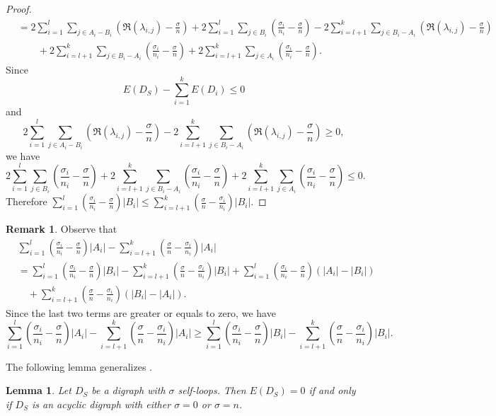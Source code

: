 \documentclass[12pt,a4paper,reqno]{amsart}
\numberwithin{equation}{section}
\theoremstyle{plain}
\newtheorem{lemma}[theorem]{Lemma}
\theoremstyle{definition}
\newtheorem{remark}[theorem]{Remark}
\newcommand{\<}{\langle}
\renewcommand{\>}{\rangle}
\begin{document}
\begin{proof}
\begin{align*}
			&= 2\sum_{i=1}^l \sum_{j\in A_i-B_i} \left( \Re(\lambda_{i,j})-\frac{\sigma}{n} \right)  + 2\sum_{i=1}^l \sum_{j\in B_i}\left(\frac{\sigma_i}{n_i}-\frac{\sigma}{n} \right) 
			- 2\sum_{i=l+1}^k \sum_{j\in B_i-A_i} \left( \Re(\lambda_{i,j})-\frac{\sigma}{n} \right) \\
			&\qquad + 2\sum_{i=l+1}^k \sum_{j\in B_i-A_i}\left(\frac{\sigma_i}{n_i}-\frac{\sigma}{n} \right)  + 2\sum_{i=l+1}^k \sum_{j\in A_i}\left(\frac{\sigma_i}{n_i}-\frac{\sigma}{n} \right).
	\end{align*}
	Since 
	\[
	E(D_S)-\sum_{i=1}^k E(D_i) \leq 0
	\]
	and 
	\[
	2\sum_{i=1}^l \sum_{j\in A_i-B_i} \left( \Re(\lambda_{i,j})-\frac{\sigma}{n} \right)  - 2\sum_{i=l+1}^k \sum_{j\in B_i-A_i} \left( \Re(\lambda_{i,j})-\frac{\sigma}{n} \right)  \geq 0,
	\] we have 
	\[
	2\sum_{i=1}^l \sum_{j\in B_i}\left(\frac{\sigma_i}{n_i}-\frac{\sigma}{n} \right)  + 2\sum_{i=l+1}^k \sum_{j\in B_i-A_i}\left(\frac{\sigma_i}{n_i}-\frac{\sigma}{n} \right)  + 2\sum_{i=l+1}^k \sum_{j\in A_i}\left(\frac{\sigma_i}{n_i}-\frac{\sigma}{n} \right) \leq 0.
	\] 
	Therefore $\sum_{i=1}^l \left( \frac{\sigma_i}{n_i}-\frac{\sigma}{n} \right)|B_i| \leq \sum_{i=l+1}^k \left( \frac{\sigma}{n}-\frac{\sigma_i}{n_i} \right) |B_i|$.
\end{proof}

\begin{remark}
	Observe that 
	\begin{align*}
		&\sum_{i=1}^l \left( \frac{\sigma_i}{n_i}-\frac{\sigma}{n}\right) |A_i| - \sum_{i=l+1}^k \left( \frac{\sigma}{n}-\frac{\sigma_i}{n_i} \right)|A_i|\\
		&=\sum_{i=1}^l \left( \frac{\sigma_i}{n_i}-\frac{\sigma}{n} \right)|B_i| - \sum_{i=l+1}^k \left( \frac{\sigma}{n}-\frac{\sigma_i}{n_i} \right) |B_i| + \sum_{i=1}^l \left( \frac{\sigma_i}{n_i}-\frac{\sigma}{n} \right)\left(|A_i|-|B_i| \right) \\
		& \quad+ \sum_{i=l+1}^k \left( \frac{\sigma}{n}-\frac{\sigma_i}{n_i} \right) \left(|B_i|-|A_i|\right).
	\end{align*}
	Since the last two terms are greater or equals to zero, we have 
	\[
	\sum_{i=1}^l \left( \frac{\sigma_i}{n_i}-\frac{\sigma}{n}\right) |A_i| - \sum_{i=l+1}^k \left( \frac{\sigma}{n}-\frac{\sigma_i}{n_i} \right)|A_i|
	\geq \sum_{i=1}^l \left( \frac{\sigma_i}{n_i}-\frac{\sigma}{n} \right)|B_i| - \sum_{i=l+1}^k \left( \frac{\sigma}{n}-\frac{\sigma_i}{n_i} \right) |B_i|.
	\]
\end{remark}

The following lemma generalizes \cite[Proposition 2.1]{rada2009mcclelland}.
 \begin{lemma}
	\label{E(D_S)=0_acyclic}
        Let $D_S$ be a digraph with $\sigma$ self-loops.
	Then $E(D_S)=0$ if and only if $D_S$ is an acyclic digraph with either $\sigma=0$ or $\sigma=n$.
\end{lemma}
\end{document}
